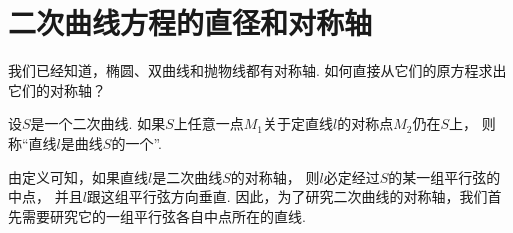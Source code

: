 \section{二次曲线方程的直径和对称轴}\label{section:解析几何.二次曲线方程的直径和对称轴}
我们已经知道，椭圆、双曲线和抛物线都有对称轴.
如何直接从它们的原方程求出它们的对称轴？

\begin{definition}
设\(S\)是一个二次曲线.
如果\(S\)上任意一点\(M_1\)关于定直线\(l\)的对称点\(M_2\)仍在\(S\)上，
则称“直线\(l\)是曲线\(S\)的一个”.
\end{definition}

由定义可知，如果直线\(l\)是二次曲线\(S\)的对称轴，
则\(l\)必定经过\(S\)的某一组平行弦的中点，
并且\(l\)跟这组平行弦方向垂直.
因此，为了研究二次曲线的对称轴，我们首先需要研究它的一组平行弦各自中点所在的直线.

